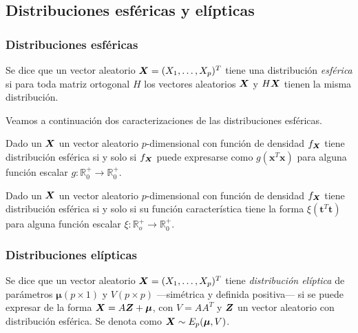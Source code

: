 \subsection{Distribuciones esféricas y elípticas}

\subsubsection{Distribuciones esféricas}

\begin{ndef}
  Se dice que un vector aleatorio $\boldsymbol{X} = (X_1, \dots, X_p)^T$ tiene una distribución \textit{esférica} si para toda matriz ortogonal $H$ los vectores aleatorios $\boldsymbol{X}$ y $H\boldsymbol{X}$ tienen la misma distribución.
\end{ndef}

Veamos a continuación dos caracterizaciones de las distribuciones esféricas.

\begin{nprop}
  Dado un $\boldsymbol{X}$ un vector aleatorio $p$-dimensional con función de densidad $f_{\boldsymbol{X}}$ tiene distribución esférica si y solo si $f_{\boldsymbol{X}}$ puede expresarse como $g(\boldsymbol x^T \boldsymbol x)$ para alguna función escalar $g : \mathbb R_0^+ \to \mathbb R_0^+$.
\end{nprop}

\begin{nprop}
  Dado un $\boldsymbol{X}$ un vector aleatorio $p$-dimensional con función de densidad $f_{\boldsymbol{X}}$ tiene distribución esférica si y solo si su función característica tiene la forma $\xi(\boldsymbol t^T \boldsymbol t)$ para alguna función escalar $\xi: \mathbb R_o^+ \to \mathbb R_0^+$.
\end{nprop}

\subsubsection{Distribuciones elípticas}

\begin{ndef}
  Se dice que un vector aleatorio $\boldsymbol{X} = (X_1, \dots, X_p)^T$ tiene \textit{distribución elíptica} de parámetros $\boldsymbol \mu (p \times 1)$ y $V (p \times p)$ —simétrica y definida positiva— si se puede expresar de la forma $\boldsymbol{X} = A\boldsymbol{Z} + \boldsymbol \mu$, con $V = AA^T$ y $\boldsymbol{Z}$ un vector aleatorio con distribución esférica. Se denota como $\boldsymbol{X} \sim E_p(\boldsymbol \mu, V)$.
\end{ndef}

